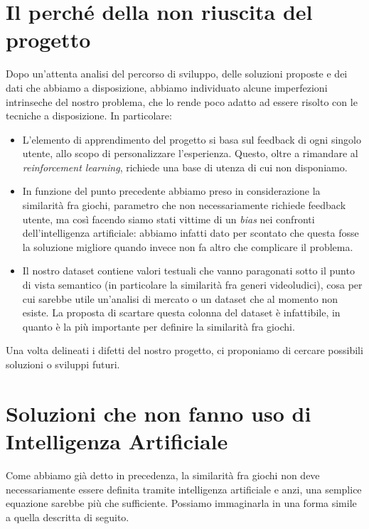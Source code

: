 \section{Il perché della non riuscita del progetto}
    Dopo un'attenta analisi del percorso di sviluppo, delle soluzioni proposte e dei dati che abbiamo a disposizione, abbiamo individuato alcune imperfezioni intrinseche del nostro problema, che lo rende poco adatto ad essere risolto con le tecniche a disposizione. In particolare:
    \begin{itemize}
        \item L'elemento di apprendimento del progetto si basa sul feedback di ogni singolo utente, allo scopo di personalizzare l'esperienza. Questo, oltre a rimandare al \textit{reinforcement learning}, richiede una base di utenza di cui non disponiamo.
        
        \item In funzione del punto precedente abbiamo preso in considerazione la similarità fra giochi, parametro che non necessariamente richiede feedback utente, ma così facendo siamo stati vittime di un \textit{bias} nei confronti dell'intelligenza artificiale: abbiamo infatti dato per scontato che questa fosse la soluzione migliore quando invece non fa altro che complicare il problema.
        
        \item Il nostro dataset contiene valori testuali che vanno paragonati sotto il punto di vista semantico (in particolare la similarità fra generi videoludici), cosa per cui sarebbe utile un'analisi di mercato o un dataset che al momento non esiste. La proposta di scartare questa colonna del dataset è infattibile, in quanto è la più importante per definire la similarità fra giochi.
    \end{itemize}
    
    Una volta delineati i difetti del nostro progetto, ci proponiamo di cercare possibili soluzioni o sviluppi futuri.
    
    \section{Soluzioni che non fanno uso di Intelligenza Artificiale}
        Come abbiamo già detto in precedenza, la similarità fra giochi non deve necessariamente essere definita tramite intelligenza artificiale e anzi, una semplice equazione sarebbe più che sufficiente. Possiamo immaginarla in una forma simile a quella descritta di seguito.
        
